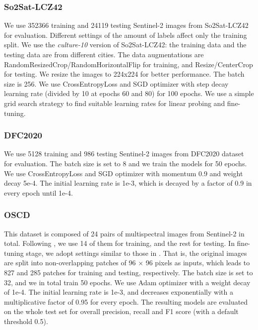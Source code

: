 \documentclass[lettersize,journal]{IEEEtran}
\begin{document}
\vspace{0.3em}
\subsubsection{So2Sat-LCZ42}
We use 352366 training and 24119 testing Sentinel-2 images from So2Sat-LCZ42 for evaluation. Different settings of the amount of labels affect only the training split. We use the \textit{culture-10} version of So2Sat-LCZ42: the training data and the testing data are from different cities. The data augmentations are RandomResizedCrop/RandomHorizontalFlip for training, and Resize/CenterCrop for testing. We resize the images to 224x224 for better performance. The batch size is 256. We use CrossEntropyLoss and SGD optimizer with step decay learning rate (divided by 10 at epochs 60 and 80) for 100 epochs. We use a simple grid search strategy to find suitable learning rates for linear probing and fine-tuning.

\vspace{0.3em}
\subsubsection{DFC2020}
We use 5128 training and 986 testing Sentinel-2 images from DFC2020 dataset for evaluation. The batch size is set to 8 and we train the models for 50 epochs. We use CrossEntropyLoss and SGD optimizer with momentum 0.9 and weight decay 5e-4. The initial learning rate is 1e-3, which is decayed by a factor of 0.9 in every epoch until 1e-4. 

\vspace{0.3em}
\subsubsection{OSCD} 
This dataset is composed of 24 pairs of multispectral images from Sentinel-2 in total. Following \citep{daudt2018urban}, we use 14 of them for training, and the rest for testing. In fine-tuning stage, we adopt settings similar to those in \citep{manas2021seasonal}. That is, the original images are split into non-overlapping patches of 96 × 96 pixels as inputs, which leads to 827 and 285 patches for training and testing, respectively. The batch size is set to 32, and we in total train 50 epochs. We use Adam optimizer with a weight decay of 1e-4. The initial learning rate is 1e-3, and decreases exponentially with a multiplicative factor of 0.95 for every epoch. The resulting models are evaluated on the whole test set for overall precision, recall and F1 score (with a default threshold 0.5). 
\end{document}
